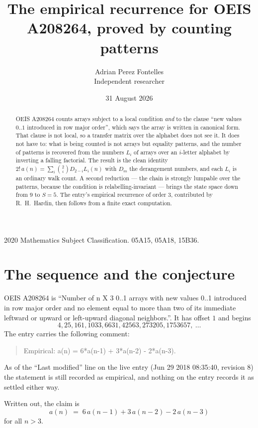\documentclass[11pt,a4paper]{article}
\title{The empirical recurrence for OEIS A208264, proved by counting patterns}
\author{Adrian Perez Fontelles\\ \small Independent researcher}
\date{31 August 2026}
\theoremstyle{plain}
\theoremstyle{definition}
\begin{document}
\maketitle

\begin{abstract}
OEIS A208264 counts arrays subject to a local condition \emph{and} to the clause ``new values
$0..1$ introduced in row major order'', which says the array is written in canonical
form. That clause is not local, so a transfer matrix over the alphabet does not see it. It
does not have to: what is being counted is not arrays but equality patterns, and the number
of patterns is recovered from the numbers $L_i$ of arrays over an $i$-letter alphabet by
inverting a falling factorial. The result is the clean identity
$2!\,a(n)=\sum_i\binom{2}{i}D_{2-i}L_i(n)$ with $D_m$ the derangement numbers,
and each $L_i$ is an ordinary walk count. A second reduction --- the chain is strongly
lumpable over the patterns, because the condition is relabelling-invariant --- brings the
state space down from $9$ to $S=5$. The entry's empirical recurrence of order
$3$, contributed by R.~H.~Hardin, then follows from a finite exact computation.
\end{abstract}

\noindent\small 2020 Mathematics Subject Classification. 05A15, 05A18, 15B36.\normalsize

\section{The sequence and the conjecture}

OEIS A208264 is ``Number of n X 3 0..1 arrays with new values 0..1 introduced in row major order and no element equal to more than two of its immediate leftward or upward or left-upward diagonal neighbors.''. It has offset $1$ and begins
\[
4, 25, 161, 1033, 6631, 42563, 273205, 1753657,\ \dots
\]
The entry carries the following comment:
\begin{quote}\small
Empirical: a(n) = 6*a(n-1) + 3*a(n-2) - 2*a(n-3).
\end{quote}
As of the ``Last modified'' line on the live entry (Jun 29 2018 08:35:40, revision 8) the statement is
still recorded as empirical, and nothing on the entry records it as settled either way.

Written out, the claim is
\begin{equation}\label{eq:conj}
a(n)\;=\;6\,a(n-1) + 3\,a(n-2) - 2\,a(n-3)
\end{equation}
for all $n>3$.
\end{document}

